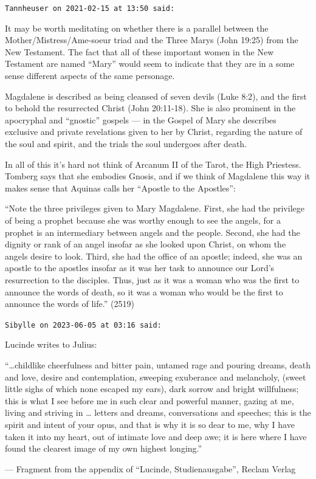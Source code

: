 \begin{footnotesize}\begin{sffamily}



\texttt{Tannheuser on 2021-02-15 at 13:50 said: }

It may be worth meditating on whether there is a parallel between the Mother/Mistress/Ame-soeur triad and the Three Marys (John 19:25) from the New Testament. The fact that all of these important women in the New Testament are named “Mary” would seem to indicate that they are in a some sense different aspects of the same personage.

Magdalene is described as being cleansed of seven devils (Luke 8:2), and the first to behold the resurrected Christ (John 20:11-18). She is also prominent in the apocryphal and “gnostic” gospels — in the Gospel of Mary she describes exclusive and private revelations given to her by Christ, regarding the nature of the soul and spirit, and the trials the soul undergoes after death.

In all of this it's hard not think of Arcanum II of the Tarot, the High Priestess. Tomberg says that she embodies Gnosis, and if we think of Magdalene this way it makes sense that Aquinas calls her “Apostle to the Apostles”:

“Note the three privileges given to Mary Magdalene. First, she had the privilege of being a prophet because she was worthy enough to see the angels, for a prophet is an intermediary between angels and the people. Second, she had the dignity or rank of an angel insofar as she looked upon Christ, on whom the angels desire to look. Third, she had the office of an apostle; indeed, she was an apostle to the apostles insofar as it was her task to announce our Lord's resurrection to the disciples. Thus, just as it was a woman who was the first to announce the words of death, so it was a woman who would be the first to announce the words of life.” (2519)


\hfill

\texttt{Sibylle on 2023-06-05 at 03:16 said: }

Lucinde writes to Julius:

“…childlike cheerfulness and bitter pain, untamed rage and pouring dreams, death and love, desire and contemplation, sweeping exuberance and melancholy, (sweet little sighs of which none escaped my ears), dark sorrow and bright willfulness; this is what I see before me in such clear and powerful manner, gazing at me, living and striving in … letters and dreams, conversations and speeches; this is the spirit and intent of your opus, and that is why it is so dear to me, why I have taken it into my heart, out of intimate love and deep awe; it is here where I have found the clearest image of my own highest longing.”

— Fragment from the appendix of “Lucinde, Studienausgabe”, Reclam Verlag


\end{sffamily}\end{footnotesize}
